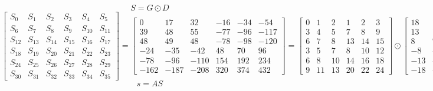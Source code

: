 \documentclass{article}%
\begin{document}
\[%
S = G \odot D%
\]%
\[%
\left[\begin{matrix}S_{0} & S_{1} & S_{2} & S_{3} & S_{4} & S_{5}\\S_{6} & S_{7} & S_{8} & S_{9} & S_{10} & S_{11}\\S_{12} & S_{13} & S_{14} & S_{15} & S_{16} & S_{17}\\S_{18} & S_{19} & S_{20} & S_{21} & S_{22} & S_{23}\\S_{24} & S_{25} & S_{26} & S_{27} & S_{28} & S_{29}\\S_{30} & S_{31} & S_{32} & S_{33} & S_{34} & S_{35}\end{matrix}\right] = \left[\begin{matrix}0 & 17 & 32 & -16 & -34 & -54\\39 & 48 & 55 & -77 & -96 & -117\\48 & 49 & 48 & -78 & -98 & -120\\-24 & -35 & -42 & 48 & 70 & 96\\-78 & -96 & -110 & 154 & 192 & 234\\-162 & -187 & -208 & 320 & 374 & 432\end{matrix}\right] = \left[\begin{matrix}0 & 1 & 2 & 1 & 2 & 3\\3 & 4 & 5 & 7 & 8 & 9\\6 & 7 & 8 & 13 & 14 & 15\\3 & 5 & 7 & 8 & 10 & 12\\6 & 8 & 10 & 14 & 16 & 18\\9 & 11 & 13 & 20 & 22 & 24\end{matrix}\right] \odot \left[\begin{matrix}18 & 17 & 16 & -16 & -17 & -18\\13 & 12 & 11 & -11 & -12 & -13\\8 & 7 & 6 & -6 & -7 & -8\\-8 & -7 & -6 & 6 & 7 & 8\\-13 & -12 & -11 & 11 & 12 & 13\\-18 & -17 & -16 & 16 & 17 & 18\end{matrix}\right]%
\]%
\[%
s = AS%
\]%
\end{document}
